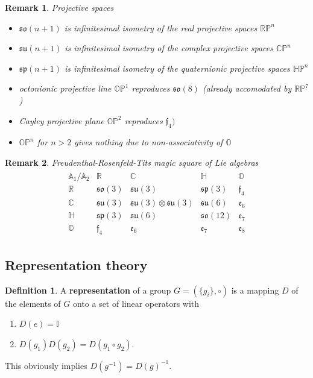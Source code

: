 \documentclass[10pt,a4paper]{article}
\newtheorem{remark}{Remark}[section]
\theoremstyle{definition}
\newtheorem{definition}{Definition}[section]
\begin{document}
\begin{remark}{}
Projective spaces
\begin{itemize}
    \item $\mathfrak{so}(n+1)$ is infinitesimal isometry of the real projective spaces $\mathbb{RP}^n$
    \item $\mathfrak{su}(n+1)$ is infinitesimal isometry of the complex projective spaces $\mathbb{CP}^n$
    \item $\mathfrak{sp}(n+1)$ is infinitesimal isometry of the quaternionic projective spaces $\mathbb{HP}^n$
    \item octonionic projective line $\mathbb{OP}^1$ reproduces $\mathfrak{so}(8)$ (already accomodated by $\mathbb{RP}^7$)
    \item Cayley projective plane $\mathbb{OP}^2$ reproduces $\mathfrak{f}_4)$
    \item $\mathbb{OP}^n$ for $n>2$ gives nothing due to non-associativity of $\mathbb{O}$
\end{itemize}
\end{remark}

\begin{remark}{}
Freudenthal-Rosenfeld-Tits magic square of Lie algebras
\begin{align}
\begin{array}{c||cccc}
\mathbb{A}_1/\mathbb{A}_2 & \mathbb{R} & \mathbb{C} & \mathbb{H} & \mathbb{O}\\ \hline\hline
\mathbb{R} & \mathfrak{so}(3) & \mathfrak{su}(3) & \mathfrak{sp}(3) & \mathfrak{f}_4 \\
\mathbb{C} & \mathfrak{su}(3) & \mathfrak{su}(3)\otimes\mathfrak{su}(3) & \mathfrak{su}(6) & \mathfrak{e}_6  \\
\mathbb{H} & \mathfrak{sp}(3) & \mathfrak{su}(6) & \mathfrak{so}(12) & \mathfrak{e}_7  \\
\mathbb{O} & \mathfrak{f}_4   & \mathfrak{e}_6 & \mathfrak{e}_7& \mathfrak{e}_8 
\end{array}
\end{align}
\end{remark}



\subsection{Representation theory}
\theoremstyle{definition}
\begin{definition}{}
A {\bf representation} of a group $G=\left(\{g_i\},\circ\right)$ is a mapping $D$ of the elements of $G$ onto a set of linear operators with
\begin{enumerate}
    \item $D(e)=\mathbb{I}$
    \item $D(g_1)D(g_2) = D(g_1\circ g_2)$.
\end{enumerate}
This obviously implies $D(g^{-1})=D(g)^{-1}$.
\end{definition}
\end{document}
